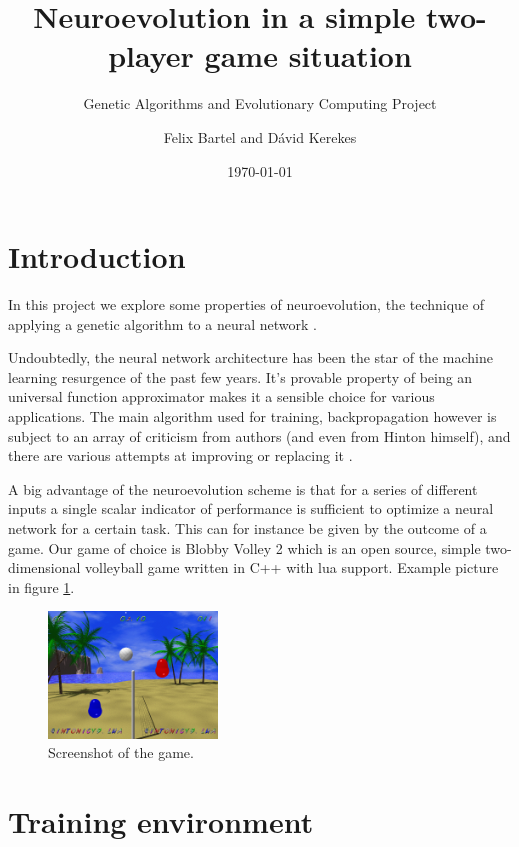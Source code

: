 \documentclass[11pt,a4paper]{scrartcl}
\date{\today}
\title{Neuroevolution in a simple two-player game situation}
\subtitle{Genetic Algorithms and Evolutionary Computing Project}
\author{Felix Bartel and D\'avid Kerekes}
\begin{document}
\maketitle

\section{Introduction}

In this project we explore some properties of neuroevolution, the technique of applying a genetic algorithm to a neural network \cite{Garis90geneticprogramming} \cite{Sims94evolving3d}.

Undoubtedly, the neural network architecture has been the star of the machine learning resurgence of the past few years. It's provable property of being an universal function approximator makes it a sensible choice for various applications. The main algorithm used for training, backpropagation however is subject to an array of criticism from authors (and even from Hinton himself), and there are various attempts at improving or replacing it \cite{zhang2007hybrid, riedmiller1993direct, montana1989training}.

A big advantage of the neuroevolution scheme is that for a series of different inputs a single scalar indicator of performance is sufficient to optimize a neural network for a certain task.
This can for instance be given by the outcome of a game.
Our game of choice is Blobby Volley 2 which is an open source, simple two-dimensional volleyball game written in C++ with lua support. Example picture in figure \ref{fig:screenshot}.

\begin{figure}[H]
\center
\includegraphics[width=0.4\textwidth]{img/screenshot.png}
\caption{Screenshot of the game.}
\label{fig:screenshot}
\end{figure}

\section{Training environment}
\end{document}
